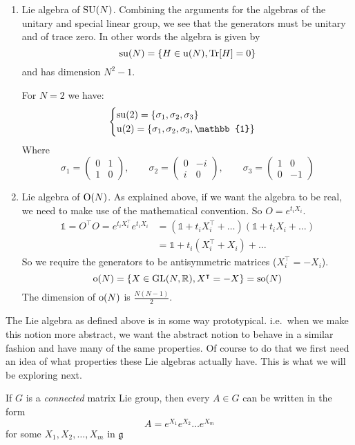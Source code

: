 \begin{example}
\begin{enumerate}
\item Lie algebra of $\operatorname{SU}(N)$. Combining the arguments for the algebras of the unitary and special linear group, we see that the generators must be unitary and of trace zero. In other words the algebra is given by
\[ \operatorname{su}(N) = \{ H\in\operatorname{u}(N), \operatorname{Tr}[H] = 0 \} \]
and has dimension $N^2-1$.

For $N=2$ we have:
\[ \begin{cases}
\suAlg(2) = \{\sigma_1, \sigma_2, \sigma_3\} \\
\uAlg(2) = \{\sigma_1, \sigma_2, \sigma_3, \mathbb{1}\}
\end{cases} \]
Where
\[ \sigma_1 = \begin{pmatrix}
0 & 1 \\ 1 & 0
\end{pmatrix}, \qquad \sigma_2 = \begin{pmatrix}
0 & -i \\ i & 0
\end{pmatrix}, \qquad \sigma_3 = \begin{pmatrix}
1 & 0 \\ 0 & -1
\end{pmatrix}\]

\item Lie algebra of $\operatorname{O}(N)$. As explained above, if we want the algebra to be real, we need to make use of the mathematical convention. So $O=e^{t_iX_i}$.
\begin{align}
\mathbb{1} = O^\intercal O = e^{t_iX_i^\intercal}e^{t_iX_i} &= (\mathbb{1}+t_i X_i^\intercal + \ldots )(\mathbb{1}+t_i X_i + \ldots) \\
&= \mathbb{1} + t_i(X^\intercal_i + X_i) + \ldots
\end{align}
So we require the generators to be antisymmetric matrices ($X_i^\intercal = -X_i$).
\[ \operatorname{o}(N) = \{ X \in \operatorname{GL}(N,\mathbb{R}), X^\intercal = -X \} = \operatorname{so}(N) \]
The dimension of $\operatorname{o}(N)$ is $\frac{N(N-1)}{2}$.
\end{enumerate}
\end{example}

The Lie algebra as defined above is in some way prototypical. i.e.\ when we make this notion more abstract, we want the abstract notion to behave in a similar fashion and have many of the same properties. Of course to do that we first need an idea of what properties these Lie algebras actually have. This is what we will be exploring next.

\begin{eigenschap}
If $G$ is a \textit{connected} matrix Lie group, then every $A \in G$ can be written in the form
\[ A = e^{X_1}e^{X_2}\ldots e^{X_m} \]
for some $X_1, X_2, \ldots, X_m$ in $\mathfrak{g}$
\end{eigenschap}

